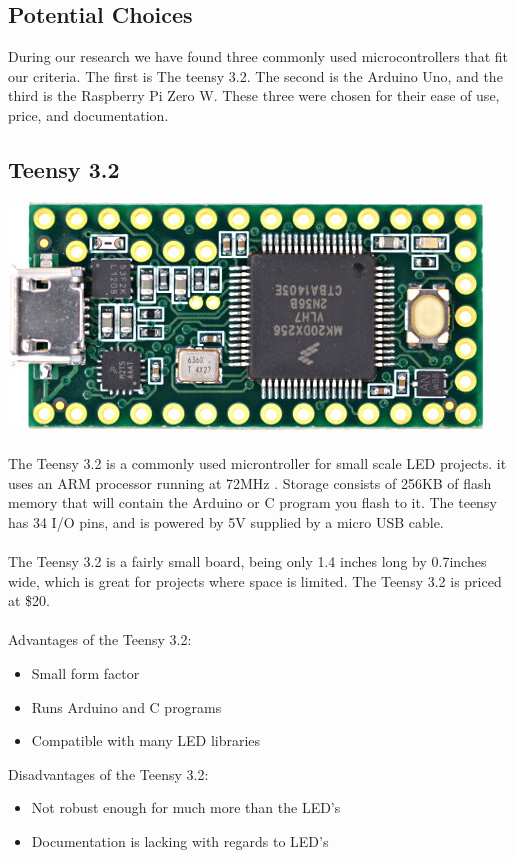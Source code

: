 \documentclass[onecolumn, draftclsnofoot,10pt, compsoc]{IEEEtran}
\begin{document}
		\subsection{Potential Choices}
		During our research we have found three commonly used microcontrollers that
		fit our criteria. The first is The teensy 3.2. The second is the Arduino Uno,
		and the third is the Raspberry Pi Zero W. These three were chosen for their
		ease of use, price, and documentation.
		\subsection{Teensy 3.2}
		\includegraphics[scale=0.8]{teensy32.jpg}
		\\\\
		The Teensy 3.2 is a commonly used microntroller for small scale LED projects.
		it uses an ARM processor running at 72MHz \cite[Pg 2]{K20}. Storage consists
		of 256KB of flash memory that will contain the Arduino or C program you
		flash to it. The teensy has 34 I/O pins, and is powered by 5V supplied by a
		micro USB cable.
		\\\\
		\noindent The Teensy 3.2 is a fairly small board, being only 1.4 inches long
		by 0.7inches wide, which is great for projects where space is limited. The
		Teensy 3.2 is priced at \$20.
		\\\\
		Advantages of the Teensy 3.2:
		\begin{itemize}
			\item Small form factor
			\item Runs Arduino and C programs
			\item Compatible with many LED libraries
		\end{itemize}
		Disadvantages of the Teensy 3.2:
		\begin{itemize}
			\item Not robust enough for much more than the LED's
			\item Documentation is lacking with regards to LED's
		\end{itemize}
\end{document}
